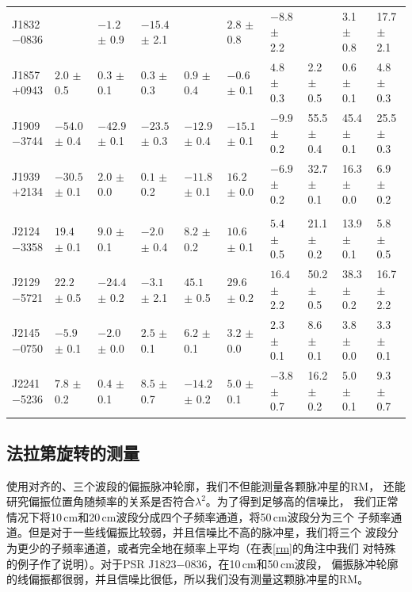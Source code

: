 \begin{landscape}
\begin{table}
\begin{center}
\begin{tabular}{p{1.9cm}p{1.88cm}p{1.88cm}p{1.88cm}p{1.88cm}p{1.88cm}p{1.88cm}p{1.8cm}p{1.8cm}p{1.8cm}}
J1832$-$0836 &                  & $-1.2 $ $\pm$ 0.9 & $-15.4$ $\pm$ 2.1 &                   & $2.8  $ $\pm$ 0.8 & $-8.8 $ $\pm$ 2.2 &                & 3.1  $\pm$ 0.8 & 17.7 $\pm$ 2.1 \\
J1857$+$0943 &$2.0  $ $\pm$ 0.5 & $0.3  $ $\pm$ 0.1 & $0.3  $ $\pm$ 0.3 & $0.9  $ $\pm$ 0.4 & $-0.6 $ $\pm$ 0.1 & $4.8  $ $\pm$ 0.3 & 2.2  $\pm$ 0.5 & 0.6  $\pm$ 0.1 & 4.8  $\pm$ 0.3 \\
J1909$-$3744 &$-54.0$ $\pm$ 0.4 & $-42.9$ $\pm$ 0.1 & $-23.5$ $\pm$ 0.3 & $-12.9$ $\pm$ 0.4 & $-15.1$ $\pm$ 0.1 & $-9.9 $ $\pm$ 0.2 & 55.5 $\pm$ 0.4 & 45.4 $\pm$ 0.1 & 25.5 $\pm$ 0.3 \\
J1939$+$2134 &$-30.5$ $\pm$ 0.1 & $2.0  $ $\pm$ 0.0 & $0.1  $ $\pm$ 0.2 & $-11.8$ $\pm$ 0.1 & $16.2 $ $\pm$ 0.0 & $-6.9 $ $\pm$ 0.2 & 32.7 $\pm$ 0.1 & 16.3 $\pm$ 0.0 & 6.9  $\pm$ 0.2 \\
             &                &                 &                &                   &                   &                   &                &                &                 \\
J2124$-$3358 &$19.4 $ $\pm$ 0.1 & $9.0  $ $\pm$ 0.1 & $-2.0 $ $\pm$ 0.4 & $8.2  $ $\pm$ 0.2 & $10.6 $ $\pm$ 0.1 & $5.4  $ $\pm$ 0.5 & 21.1 $\pm$ 0.2 & 13.9 $\pm$ 0.1 & 5.8  $\pm$ 0.5 \\
J2129$-$5721 &$22.2 $ $\pm$ 0.5 & $-24.4$ $\pm$ 0.2 & $-3.1 $ $\pm$ 2.1 & $45.1 $ $\pm$ 0.5 & $29.6 $ $\pm$ 0.2 & $16.4 $ $\pm$ 2.2 & 50.2 $\pm$ 0.5 & 38.3 $\pm$ 0.2 & 16.7 $\pm$ 2.2 \\
J2145$-$0750 &$-5.9 $ $\pm$ 0.1 & $-2.0 $ $\pm$ 0.0 & $2.5  $ $\pm$ 0.1 & $6.2  $ $\pm$ 0.1 & $3.2  $ $\pm$ 0.0 & $2.3  $ $\pm$ 0.1 & 8.6  $\pm$ 0.1 & 3.8  $\pm$ 0.0 & 3.3  $\pm$ 0.1 \\
J2241$-$5236 &$7.8  $ $\pm$ 0.2 & $0.4  $ $\pm$ 0.1 & $8.5  $ $\pm$ 0.7 & $-14.2$ $\pm$ 0.2 & $5.0  $ $\pm$ 0.1 & $-3.8 $ $\pm$ 0.7 & 16.2 $\pm$ 0.2 & 5.0  $\pm$ 0.1 & 9.3  $\pm$ 0.7 \\
\hline
\end{tabular}
\end{center}
\end{table}
\end{landscape}

\subsection{法拉第旋转的测量}

使用对齐的、三个波段的偏振脉冲轮廓，我们不但能测量各颗脉冲星的RM，
还能研究偏振位置角随频率的关系是否符合$\lambda^2$。为了得到足够高的信噪比，
我们正常情况下将10\,cm和20\,cm波段分成四个子频率通道，将50\,cm波段分为三个
子频率通道。但是对于一些线偏振比较弱，并且信噪比不高的脉冲星，我们将三个
波段分为更少的子频率通道，或者完全地在频率上平均（在表\ref{rm}的角注中我们
对特殊的例子作了说明）。对于PSR J1823$-$0836，在10\,cm和50\,cm波段，
偏振脉冲轮廓的线偏振都很弱，并且信噪比很低，所以我们没有测量这颗脉冲星的RM。

